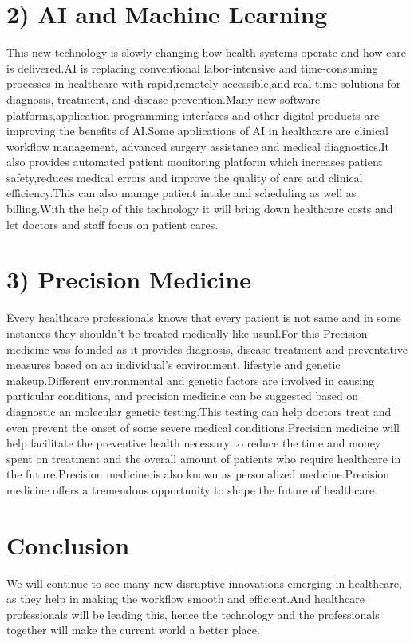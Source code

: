 \documentclass{article}[A4,12pt]
\begin{document}
\section*{2) AI and Machine Learning}
This new technology is slowly changing how health systems operate and how care is delivered.AI is replacing conventional labor-intensive and time-consuming processes in healthcare with rapid,remotely accessible,and real-time solutions for diagnosis, treatment, and disease prevention.Many new software platforms,application programming interfaces and other digital products are improving the benefits of AI.Some applications of AI in healthcare are clinical workflow management, advanced surgery assistance and medical diagnostics.It also provides automated patient monitoring platform which increases patient safety,reduces medical errors and improve the quality of care and clinical efficiency.This can also manage patient intake and scheduling as well as billing.With the help of this technology it will bring down healthcare costs and let doctors and staff focus on patient cares.

\section*{3) Precision Medicine}
Every healthcare professionals knows that every patient is not same and in some instances they shouldn't be treated medically like usual.For this Precision medicine was founded as it provides diagnosis, disease treatment and preventative measures based on an individual's environment, lifestyle and genetic makeup.Different environmental and genetic factors are involved in causing particular conditions, and precision medicine can be suggested based on diagnostic an molecular genetic testing.This testing can help doctors treat and even prevent the onset of some severe medical conditions.Precision medicine will help facilitate the preventive health necessary to reduce the time and money spent on treatment and the overall amount of patients who require healthcare in the future.Precision medicine is also known as personalized medicine.Precision medicine offers a tremendous opportunity to shape the future of healthcare.

\section*{Conclusion}
We will continue to see many new disruptive innovations emerging in healthcare, as they help in making the workflow smooth and efficient.And healthcare professionals will be leading this, hence the technology and the professionals together will make the current world a better place. 
\end{document}
